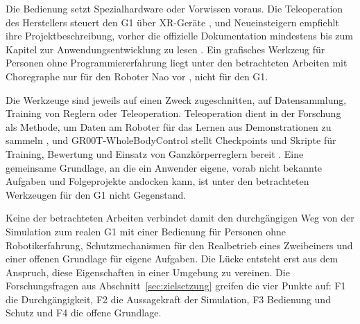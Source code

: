 Die Bedienung setzt Spezialhardware oder Vorwissen voraus.
Die Teleoperation des Herstellers steuert den G1 über XR-Geräte \cite{UnitreeXRTeleop}, und Neueinsteigern empfiehlt ihre Projektbeschreibung, vorher die offizielle Dokumentation mindestens bis zum Kapitel zur Anwendungsentwicklung zu lesen \cite{UnitreeXRTeleop}.
Ein grafisches Werkzeug für Personen ohne Programmiererfahrung liegt unter den betrachteten Arbeiten mit Choregraphe nur für den Roboter Nao vor \cite{Pot2009}, nicht für den G1.

Die Werkzeuge sind jeweils auf einen Zweck zugeschnitten, auf Datensammlung, Training von Reglern oder Teleoperation.
Teleoperation dient in der Forschung als Methode, um Daten am Roboter für das Lernen aus Demonstrationen zu sammeln \cite{Cheng2024}, und GR00T-WholeBodyControl stellt Checkpoints und Skripte für Training, Bewertung und Einsatz von Ganzkörperreglern bereit \cite{NvidiaGR00TWBC}.
Eine gemeinsame Grundlage, an die ein Anwender eigene, vorab nicht bekannte Aufgaben und Folgeprojekte andocken kann, ist unter den betrachteten Werkzeugen für den G1 nicht Gegenstand.

Keine der betrachteten Arbeiten verbindet damit den durchgängigen Weg von der Simulation zum realen G1 mit einer Bedienung für Personen ohne Robotikerfahrung, Schutzmechanismen für den Realbetrieb eines Zweibeiners und einer offenen Grundlage für eigene Aufgaben.
Die Lücke entsteht erst aus dem Anspruch, diese Eigenschaften in einer Umgebung zu vereinen.
Die Forschungsfragen aus Abschnitt~\ref{sec:zielsetzung} greifen die vier Punkte auf: F1 die Durchgängigkeit, F2 die Aussagekraft der Simulation, F3 Bedienung und Schutz und F4 die offene Grundlage.
